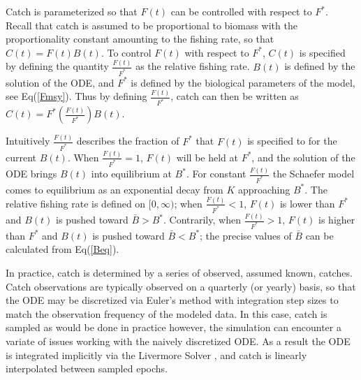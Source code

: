 \documentclass[12pt]{article}
\begin{document}
%
Catch is parameterized so that $F(t)$ can be controlled with respect to $F^*$. 
Recall that catch is assumed to be proportional to biomass with the 
proportionality constant amounting to the fishing rate, so that $C(t)=F(t)B(t)$. 
To control $F(t)$ with respect to $F^*$, $C(t)$ is specified by defining the 
quantity $\frac{F(t)}{F^*}$ as the relative fishing rate. $B(t)$ is defined 
by the solution of the ODE, and $F^*$ is defined by the biological parameters 
of the model, see Eq(\ref{Fmsy}).  Thus by defining 
$\frac{F(t)}{F^*}$, catch can then be written as \mbox{$C(t)=F^*\left(\frac{F(t)}{F^*}\right)B(t)$.}

%
Intuitively $\frac{F(t)}{F^*}$ describes the fraction of $F^*$ that $F(t)$ is  
specified to for the current $B(t)$. When $\frac{F(t)}{F^*}=1$, $F(t)$ will be 
held at $F^*$, and the solution of the ODE brings $B(t)$ into equilibrium at 
$B^*$. For constant $\frac{F(t)}{F^*}$ the Schaefer model 
comes to equilibrium as an exponential decay from $K$ approaching $B^*$. The relative fishing rate is defined on $[0, \infty)$; when 
$\frac{F(t)}{F^*}<1$, $F(t)$ is lower than $F^*$ and $B(t)$ is pushed toward 
$\bar B>B^*$. Contrarily, when $\frac{F(t)}{F^*}>1$, $F(t)$ is higher than 
$F^*$ and $B(t)$ is pushed toward $\bar B<B^*$; the precise values of $\bar B$
can be calculated from Eq(\ref{Beq}).

%
In practice, catch is determined by a series of observed, assumed known, catches. 
Catch observations are typically observed on a quarterly (or yearly) basis, so 
that the ODE may be discretized via Euler’s method with integration step sizes 
to match the observation frequency of the modeled data. In this case, catch is sampled 
as would be done in practice however, the simulation can encounter a variate of issues 
working with the naively discretized ODE. As a result the ODE is integrated implicitly 
via the Livermore Solver , and catch 
is linearly interpolated between sampled epochs. 

\end{document}
